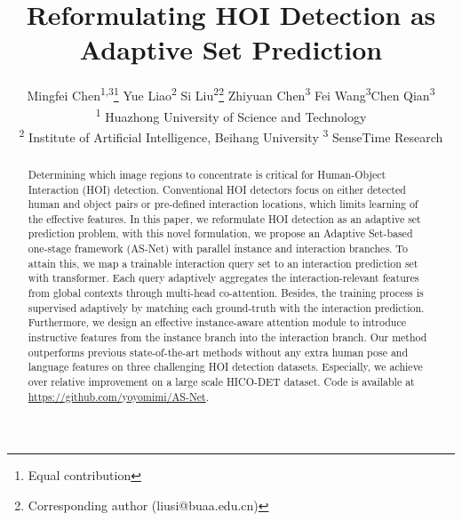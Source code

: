\documentclass[final]{cvpr}
\makeatletter
\newcommand{\printfnsymbol}[1]{\textsuperscript{\@fnsymbol{#1}}}
\makeatother
\begin{document}
\title{Reformulating HOI Detection as Adaptive Set Prediction}

\author{Mingfei Chen\textsuperscript{\rm 1,3}\thanks{Equal contribution} \quad Yue Liao\textsuperscript{\rm 2}\printfnsymbol{1} \quad Si Liu\textsuperscript{\rm 2}\thanks{Corresponding author (liusi@buaa.edu.cn)} \quad Zhiyuan Chen\textsuperscript{\rm 3} \quad Fei Wang\textsuperscript{\rm 3}\quad Chen Qian\textsuperscript{\rm 3}\\
\large\textsuperscript{\rm 1} Huazhong University of Science and Technology \\ \textsuperscript{\rm 2} Institute of Artificial Intelligence, Beihang University \quad\textsuperscript{\rm 3} SenseTime Research}

\maketitle
\thispagestyle{empty}
\pagestyle{empty}
\begin{abstract}
Determining which image regions to concentrate is critical for Human-Object Interaction (HOI) detection. Conventional HOI detectors focus on either detected human and object pairs or pre-defined interaction locations, which limits learning of the effective features. In this paper, we reformulate HOI detection as an adaptive set prediction problem, with this novel formulation, we propose an Adaptive Set-based one-stage framework (AS-Net) with parallel instance and interaction branches. To attain this, we map a trainable interaction query set to an interaction prediction set with transformer. Each query adaptively aggregates the interaction-relevant features from global contexts through multi-head co-attention. Besides, the training process is supervised adaptively by matching each ground-truth with the interaction prediction. Furthermore, we design an effective instance-aware attention module to introduce instructive features from the instance branch into the interaction branch. Our method outperforms previous state-of-the-art methods without any extra human pose and language features on three challenging HOI detection datasets. Especially, we achieve over  relative improvement on a large scale HICO-DET dataset. Code is available at \url{https://github.com/yoyomimi/AS-Net}.
\end{abstract}
\end{document}
